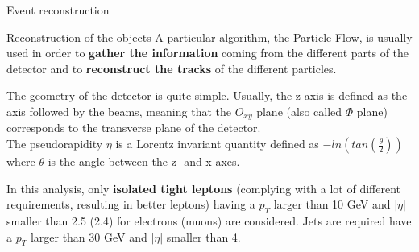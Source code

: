 \documentclass[8 pt]{beamer}
\begin{document}
\begin{frame}{Event reconstruction}

	\begin{block}{\vspace{5pt} Reconstruction of the objects}
	\justifying
	\vspace{5pt}
	A particular algorithm, the Particle Flow, is usually used in order to \textbf{gather the information} coming from the different parts of the detector and to \textbf{reconstruct the tracks} of the different particles.\vspace{5pt}\vfill
	\end{block}

	\vspace{8pt}

	\begin{minipage}[c]{.54\linewidth}
	\end{minipage}
	 \begin{minipage}[c]{.44\linewidth}
   		\justifying 
		The geometry of the detector is quite simple. Usually, the z-axis is defined as the axis followed by the beams, meaning that the $O_{xy}$ plane (also called $\Phi$ plane) corresponds to the transverse plane of the detector. \\ \vspace{8pt}
		The pseudorapidity $\eta$ is a Lorentz invariant quantity defined as $-ln\left(tan(\frac{\theta}{2}) \right)$ where $\theta$ is the angle between the z- and x-axes.
		
	\end{minipage}
	
	\vspace{5pt}
	\justifying
	In this analysis, only \textbf{isolated tight leptons} (complying with a lot of different requirements, resulting in better leptons) having a $p_T$ larger than 10 GeV and $|\eta|$ smaller than 2.5 (2.4) for electrons (muons) are considered. Jets are required have a $p_T$ larger than 30 GeV and $|\eta|$ smaller than 4. \vfill

\end{frame}
\end{document}
